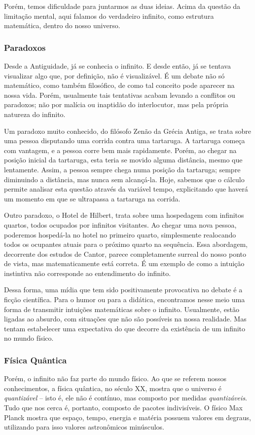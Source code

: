 \documentclass[journal,transmag]{IEEEtran}
\begin{document}
Porém, temos dificuldade para juntarmos as duas ideias. Acima da questão da
limitação mental, aqui falamos do verdadeiro infinito, como estrutura
matemática, dentro do nosso universo.

\subsubsection{Paradoxos}
Desde a Antiguidade, já se conhecia o infinito. E desde então, já se tentava
visualizar algo que, por definição, não é visualizável. É um debate não só
matemático, como também filosófico, de como tal conceito pode aparecer na nossa
vida. Porém, usualmente tais tentativas acabam levando a conflitos ou paradoxos;
não por malícia ou inaptidão do interlocutor, mas pela própria natureza do infinito.

Um paradoxo muito conhecido, do filósofo Zenão da Grécia Antiga, se trata sobre
uma pessoa disputando uma corrida contra uma tartaruga. A tartaruga começa com vantagem,
e a pessoa corre bem mais rapidamente. Porém, ao chegar na posição inicial
da tartaruga, esta teria se movido alguma distância, mesmo que lentamente.
Assim, a pessoa sempre chega numa posição da tartaruga; sempre diminuindo a distância,
mas nunca sem alcançá-la. Hoje, sabemos que o cálculo permite analisar esta questão
através da variável tempo, explicitando que haverá um momento em que se ultrapassa
a tartaruga na corrida.

Outro paradoxo, o Hotel de Hilbert, trata sobre uma hospedagem com infinitos quartos,
todos ocupados por infinitos visitantes. Ao chegar uma nova pessoa, poderemos
hospedá-la no hotel no primeiro quarto, simplesmente realocando todos os
ocupantes atuais para o próximo quarto na sequência. Essa abordagem,
decorrente dos estudos de Cantor, parece completamente surreal do nosso ponto
de vista, mas matematicamente está correta. É um exemplo de como a intuição
instintiva não corresponde ao entendimento do infinito.

Dessa forma, uma mídia que tem sido positivamente provocativa no debate é a
ficção científica. Para o humor ou para a didática, encontramos nesse meio
uma forma de transmitir intuições matemáticas sobre o infinito. Usualmente,
estão ligadas ao absurdo, com situações que não são possíveis na nossa realidade.
Mas tentam estabelecer uma expectativa do que decorre da existência de um infinito
no mundo físico.

\subsubsection{Física Quântica}
Porém, o infinito não faz parte do mundo físico. Ao que se referem nossos
conhecimentos, a física quântica, no século XX, mostra que o universo é \emph{quantizável}
-- isto é, ele não é contínuo, mas composto por medidas
\emph{quantizáveis}. Tudo que nos cerca é, portanto, composto de pacotes
indivisíveis. O físico Max Planck mostra que espaço, tempo, energia e matéria
possuem valores em degraus, utilizando para isso valores astronômicos minúsculos.
\end{document}
